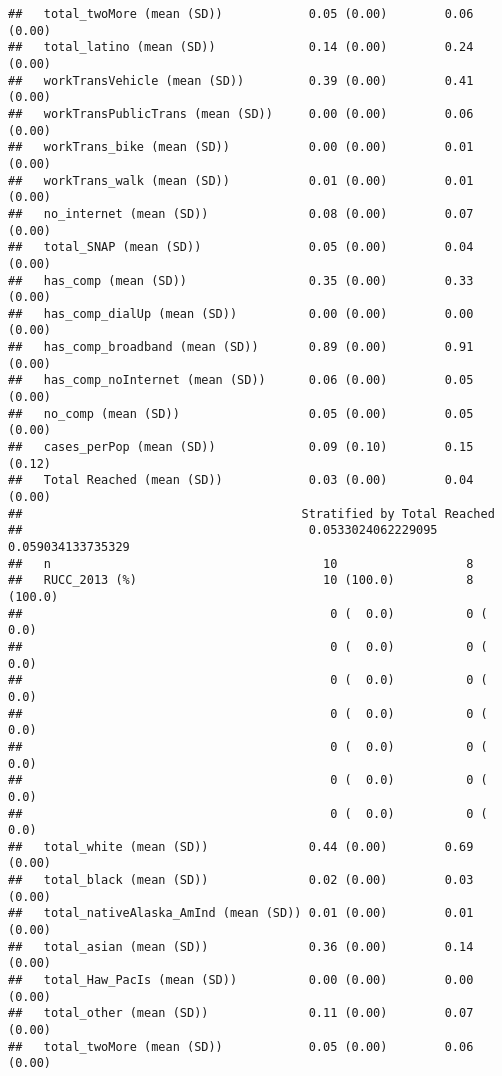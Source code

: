 \documentclass[
]{article}
\begin{document}
\begin{verbatim}
##   total_twoMore (mean (SD))            0.05 (0.00)        0.06 (0.00)       
##   total_latino (mean (SD))             0.14 (0.00)        0.24 (0.00)       
##   workTransVehicle (mean (SD))         0.39 (0.00)        0.41 (0.00)       
##   workTransPublicTrans (mean (SD))     0.00 (0.00)        0.06 (0.00)       
##   workTrans_bike (mean (SD))           0.00 (0.00)        0.01 (0.00)       
##   workTrans_walk (mean (SD))           0.01 (0.00)        0.01 (0.00)       
##   no_internet (mean (SD))              0.08 (0.00)        0.07 (0.00)       
##   total_SNAP (mean (SD))               0.05 (0.00)        0.04 (0.00)       
##   has_comp (mean (SD))                 0.35 (0.00)        0.33 (0.00)       
##   has_comp_dialUp (mean (SD))          0.00 (0.00)        0.00 (0.00)       
##   has_comp_broadband (mean (SD))       0.89 (0.00)        0.91 (0.00)       
##   has_comp_noInternet (mean (SD))      0.06 (0.00)        0.05 (0.00)       
##   no_comp (mean (SD))                  0.05 (0.00)        0.05 (0.00)       
##   cases_perPop (mean (SD))             0.09 (0.10)        0.15 (0.12)       
##   Total Reached (mean (SD))            0.03 (0.00)        0.04 (0.00)       
##                                       Stratified by Total Reached
##                                        0.0533024062229095 0.059034133735329
##   n                                      10                  8             
##   RUCC_2013 (%)                          10 (100.0)          8 (100.0)     
##                                           0 (  0.0)          0 (  0.0)     
##                                           0 (  0.0)          0 (  0.0)     
##                                           0 (  0.0)          0 (  0.0)     
##                                           0 (  0.0)          0 (  0.0)     
##                                           0 (  0.0)          0 (  0.0)     
##                                           0 (  0.0)          0 (  0.0)     
##                                           0 (  0.0)          0 (  0.0)     
##   total_white (mean (SD))              0.44 (0.00)        0.69 (0.00)      
##   total_black (mean (SD))              0.02 (0.00)        0.03 (0.00)      
##   total_nativeAlaska_AmInd (mean (SD)) 0.01 (0.00)        0.01 (0.00)      
##   total_asian (mean (SD))              0.36 (0.00)        0.14 (0.00)      
##   total_Haw_PacIs (mean (SD))          0.00 (0.00)        0.00 (0.00)      
##   total_other (mean (SD))              0.11 (0.00)        0.07 (0.00)      
##   total_twoMore (mean (SD))            0.05 (0.00)        0.06 (0.00)      

\end{verbatim}
\end{document}
